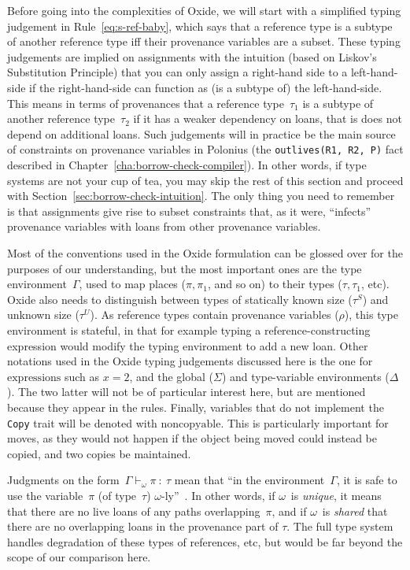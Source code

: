 \documentclass[11pt,a4paper,twoside,openany]{report}
\newcommand{\InRust}[1]{\texttt{#1}}
\newcommand{\InDatalog}[1]{\texttt{#1}}
\newcommand{\expression}[1]{\boxed{#1}}
\newcommand{\decoline}{%
   \par
   \vspace{\baselineskip}
   \hfill
   \ding{100}
   \hfill
   \vspace{\baselineskip}
\par}
\renewcommand\_{\textunderscore\allowbreak}
\begin{document}
Before going into the complexities of Oxide, we will start with a simplified
typing judgement in Rule~\eqref{eq:s-ref-baby}, which says that a reference type
is a subtype of another reference type iff their provenance variables are a
subset. These typing judgements are implied on assignments with the intuition
(based on Liskov's Substitution Principle) that you can only assign a right-hand
side to a left-hand-side if the right-hand-side can function as (is a subtype
of) the left-hand-side. This means in terms of provenances that a reference
type~$\tau_1$ is a subtype of another reference type~$\tau_2$ if it has a weaker
dependency on loans, that is does not depend on additional loans. Such
judgements will in practice be the main source of constraints on provenance
variables in Polonius (the \InDatalog{outlives(R1, R2, P)} fact described in
Chapter~\ref{cha:borrow-check-compiler}). In other words, if type systems are
not your cup of tea, you may skip the rest of this section and proceed with
Section~\ref{sec:borrow-check-intuition}. The only thing you need to remember is
that assignments give rise to subset constraints that, as it were, ``infects''
provenance variables with loans from other provenance variables.

\decoline{}

Most of the conventions used in the Oxide formulation can be glossed over for
the purposes of our understanding, but the most important ones are the type
environment~$\Gamma$, used to map places ($\pi, \pi_1$, and so on) to their
types ($\tau, \tau_1$, etc). Oxide also needs to distinguish between types of
statically known size ($\tau^S$) and unknown size ($\tau^U$). As reference types
contain provenance variables ($\rho$), this type environment is stateful, in
that for example typing a reference-constructing expression would modify the
typing environment to add a new loan. Other notations used in the Oxide typing
judgements discussed here is the one for $\expression{\text{expressions}}$ such
as $\expression{x = 2}$, and the global ($\Sigma$) and type-variable
environments ($\Delta$). The two latter will not be of particular interest here,
but are mentioned because they appear in the rules. Finally, variables that do
not implement the \InRust{Copy} trait will be denoted with $\text{noncopyable}$.
This is particularly important for moves, as they would not happen if the object
being moved could instead be copied, and two copies be maintained.


Judgments on the form~$\Gamma \vdash_{\omega} \pi \: : \: \tau$ mean that ``in
the environment~$\Gamma$, it is safe to use the variable~$\pi$ (of type~$\tau$)
$\omega$-ly''~\cite{weiss_oxide:_2019}. In other words, if $\omega$~is
\emph{unique}, it means that there are no live loans of any paths
overlapping~$\pi$, and if $\omega$~is \emph{shared} that there are no
overlapping loans in the provenance part of $\tau$. The full type system handles
degradation of these types of references, etc, but would be far beyond the scope
of our comparison here.
\end{document}
